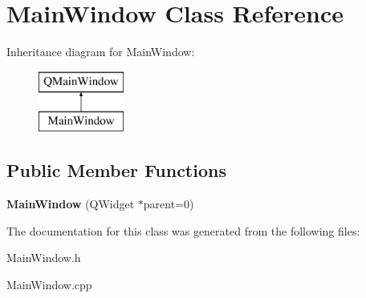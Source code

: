 \hypertarget{classMainWindow}{}\section{Main\+Window Class Reference}
\label{classMainWindow}
Inheritance diagram for Main\+Window\+:\begin{figure}[H]
\begin{center}
\leavevmode
\includegraphics[height=2.000000cm]{classMainWindow}
\end{center}
\end{figure}
\subsection*{Public Member Functions}
\begin{DoxyCompactItemize}
\item 
{\bfseries Main\+Window} (Q\+Widget $\ast$parent=0)\hypertarget{classMainWindow_a8b244be8b7b7db1b08de2a2acb9409db}{}\label{classMainWindow_a8b244be8b7b7db1b08de2a2acb9409db}

\end{DoxyCompactItemize}


The documentation for this class was generated from the following files\+:\begin{DoxyCompactItemize}
\item 
Main\+Window.\+h\item 
Main\+Window.\+cpp\end{DoxyCompactItemize}
